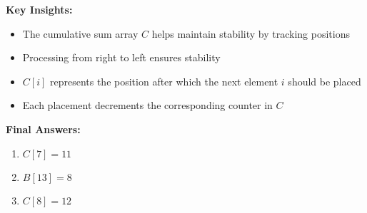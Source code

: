 \textbf{Key Insights:}
\begin{itemize}[noitemsep]
    \item The cumulative sum array $C$ helps maintain stability by tracking positions
    \item Processing from right to left ensures stability
    \item $C[i]$ represents the position after which the next element $i$ should be placed
    \item Each placement decrements the corresponding counter in $C$
\end{itemize}

\textbf{Final Answers:}
\begin{enumerate}[noitemsep]
    \item $C[7] = 11$
    \item $B[13] = 8$
    \item $C[8] = 12$
\end{enumerate}
